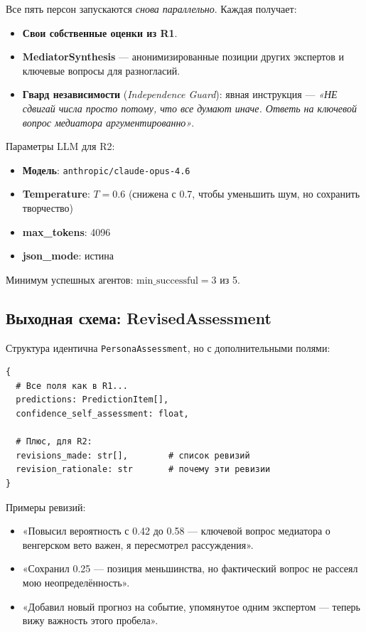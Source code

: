 
Все пять персон запускаются \emph{снова параллельно}. Каждая получает:

\begin{itemize}
    \item \textbf{Свои собственные оценки из R1}.
    \item \textbf{MediatorSynthesis} — анонимизированные позиции других экспертов и ключевые вопросы для разногласий.
    \item \textbf{Гвард независимости} (\emph{Independence Guard}): явная инструкция — \textit{«НЕ сдвигай числа просто потому, что все думают иначе. Ответь на ключевой вопрос медиатора аргументированно»}.
\end{itemize}

Параметры LLM для R2:
\begin{itemize}
    \item \textbf{Модель}: \texttt{anthropic/claude-opus-4.6}
    \item \textbf{Temperature}: $T = 0.6$ (снижена с 0.7, чтобы уменьшить шум, но сохранить творчество)
    \item \textbf{max\_tokens}: 4096
    \item \textbf{json\_mode}: истина
\end{itemize}

Минимум успешных агентов: $\text{min\_successful} = 3$ из 5.

\subsection{Выходная схема: RevisedAssessment}

Структура идентична \texttt{PersonaAssessment}, но с дополнительными полями:

\begin{verbatim}
{
  # Все поля как в R1...
  predictions: PredictionItem[],
  confidence_self_assessment: float,

  # Плюс, для R2:
  revisions_made: str[],        # список ревизий
  revision_rationale: str       # почему эти ревизии
}
\end{verbatim}

Примеры ревизий:
\begin{itemize}
    \item «Повысил вероятность с 0.42 до 0.58 — ключевой вопрос медиатора о венгерском вето важен, я пересмотрел рассуждения».
    \item «Сохранил 0.25 — позиция меньшинства, но фактический вопрос не рассеял мою неопределённость».
    \item «Добавил новый прогноз на событие, упомянутое одним экспертом — теперь вижу важность этого пробела».
\end{itemize}

